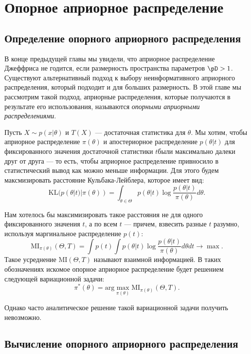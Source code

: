 \section{Опорное априорное распределение}
\label{sec:reference_prior}

\subsection{Определение опорного априорного распределения}

В конце предыдущей главы мы увидели, что априорное распределение Джеффриса не годится, если размерность пространства параметров $\pD > 1$.
Существуют альтернативный подход к выбору неинформативного априорного распределения, который подходит и для больших размерность.
В этой главе мы рассмотрим такой подход, априорные распределения, которые получаются в результате его использования, называются
\emph{опорными априорными распределениями}.

Пусть $X \sim p(x | \theta)$ и $T(X)$ --- достаточная статистика для $\theta$.
Мы хотим, чтобы априорное распределение $\pi(\theta)$ и апостериорное распределение $p(\theta | t)$ для фиксированного значения достаточной статистики $t$были максимально далеки друг от друга --- то есть,
чтобы априорное распределение привносило в статистический вывод как можно меньше информации.
Для этого будем максмизировать расстояние Кульбака-Лейблера, которое имеет вид:
\[
\mathrm{KL}(p(\theta | t) | \pi(\theta)) = \int_{\theta \in \Theta} p(\theta | t) \log \frac{p(\theta | t)}{\pi(\theta)} d\theta.
\]

Нам хотелось бы максимизировать такое расстояния не для одного фиксированного значения $t$, а по всем $t$ --- причем, взвесить разные $t$ разумно,
используя маргинальное распределение $p(t)$:
\[
\mathrm{MI}_{\pi(\theta)}(\Theta, T) = \int p(t) \int p(\theta | t) \log \frac{p(\theta | t)}{\pi(\theta)} d\theta dt \rightarrow \max.
\]
Такое усреднение $\mathrm{MI}(\Theta, T)$ называют взаимной информацией.
В таких обозначениях искомое опорное априорное распределение будет решением следующей вариационной задачи:
\[
\pi^*(\theta) = \mathrm{arg} \max_{\pi(\theta)} \mathrm{MI}_{\pi(\theta)}(\Theta, T).
\]

Однако часто аналитическое решение такой вариационной задачи получить невозможно.

\subsection{Вычисление опорного априорного распределения}

